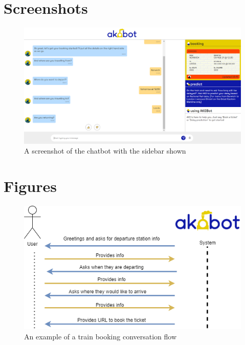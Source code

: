 \documentclass[11pt]{article}
\begin{document}

%

\clearpage
\appendixpage
\begin{appendices}
\section{Screenshots}

\begin{figure}[!ht]
    \centering
    \includegraphics[width=\textwidth]{AkobotSidebar.png}
    \caption{A screenshot of the chatbot with the sidebar shown}
    \label{fig:sidebarAkobot}
\end{figure}

\clearpage
\section{Figures}

\begin{figure}[!ht]
            \centering
            \includegraphics[width=.95\textwidth]{OldBookingFlow.png}
            \caption{An example of a train booking conversation flow}
            \label{fig:OldBookingFlow}
        \end{figure}
        

\end{appendices}
\end{document}
